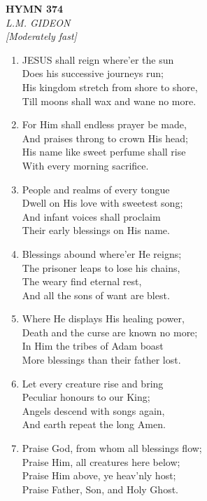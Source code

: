 \documentclass[11pt,a4paper]{article}
\begin{document}
\newpage
\begin{center}
    {\Large \textbf{HYMN 374}}
    \\
    \textit{L.M. GIDEON}
    \\
    \textit{\small [Moderately fast]}
\end{center}
\vspace{1em}

\begin{enumerate}
    \item JESUS shall reign where'er the sun \\
        Does his successive journeys run; \\
        His kingdom stretch from shore to shore, \\
        Till moons shall wax and wane no more.

    \item For Him shall endless prayer be made, \\
        And praises throng to crown His head; \\
        His name like sweet perfume shall rise \\
        With every morning sacrifice.

    \item People and realms of every tongue \\
        Dwell on His love with sweetest song; \\
        And infant voices shall proclaim \\
        Their early blessings on His name.

    \item Blessings abound where'er He reigns; \\
        The prisoner leaps to lose his chains, \\
        The weary find eternal rest, \\
        And all the sons of want are blest.

    \item Where He displays His healing power, \\
        Death and the curse are known no more; \\
        In Him the tribes of Adam boast \\
        More blessings than their father lost.

    \item Let every creature rise and bring \\
        Peculiar honours to our King; \\
        Angels descend with songs again, \\
        And earth repeat the long Amen.

    \item Praise God, from whom all blessings flow; \\
        Praise Him, all creatures here below; \\
        Praise Him above, ye heav'nly host; \\
        Praise Father, Son, and Holy Ghost.

\end{enumerate}
\end{document}
